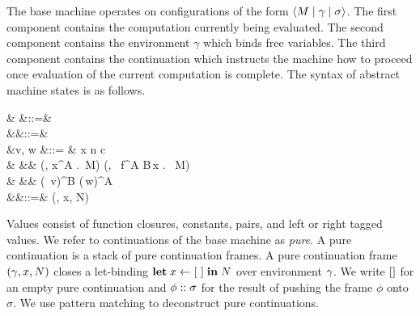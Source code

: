 \documentclass[12pt,phd,lfcs,twoside,openright,logo,leftchapter,normalheadings]{infthesis}
\theoremstyle{plain}
\theoremstyle{definition}
\begin{document}
The base machine operates on configurations of the form
$\langle M \mid \gamma \mid \sigma \rangle$. The first component contains the
computation currently being evaluated. The second component contains
the environment $\gamma$ which binds free variables. The third
component contains the continuation which instructs the machine how to
proceed once evaluation of the current computation is complete.
%
The syntax of abstract machine states is as follows.
{
\begin{syntax}
           & \conf \in \Conf  &::=&  \\
       &\env \in \Env   &::=& \emptyset \mid \env[x \mapsto v] \\
 &v, w \in \MValCat  &::= & x \mid n \mid c \mid \Unit \mid {} \\
                                &                &\mid& (\env, \lambda x^A .\, M) \mid (\env, \Rec\, f^{A \to B}\,x . \, M)\\
                                &                &\mid&  (\Inl\, v)^B \mid (\Inr\,w)^A \\
  &\sigma \in \MPContCat &::=& \nil \mid (\env, x, N) \cons \sigma \\
\end{syntax}}%
%
Values consist of function closures, constants, pairs, and left or
right tagged values.
%
We refer to continuations of the base machine as \emph{pure}.
%
A pure continuation is a stack of pure continuation frames. A pure
continuation frame $(\gamma, x, N)$ closes a let-binding $\mathbf{let} \;x
\leftarrow [~] \;\mathbf{in}\;N$ over environment $\gamma$.
%
We write $[]$ for an empty pure continuation and $\phi :: \sigma$
for the result of pushing the frame $\phi$ onto $\sigma$. We use
pattern matching to deconstruct pure continuations.
%
\end{document}
